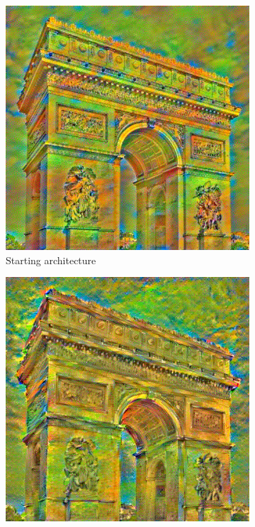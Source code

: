 \documentclass[twocolumn,superscriptaddress,aps, floatfix]{revtex4-1}
\begin{document}
    \begin{figure}[ht]
        \centering
        \begin{subfigure}[b]{0.22\textwidth}
            \centering
            \includegraphics[width=\textwidth]{resources/png/layers/layers_default.png}
            \caption{Starting architecture}
        \end{subfigure}
        \hfill
        \begin{subfigure}[b]{0.22\textwidth}
            \centering
            \includegraphics[width=\textwidth]{resources/png/layers/layers_nicer.png}

\end{subfigure}
\end{figure}
\end{document}
